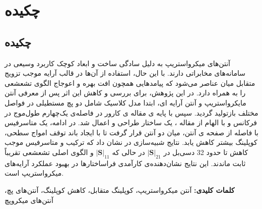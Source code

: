 \chapter*{چکیده}
\thispagestyle{empty}
\section*{چکیده}

آنتن‌های میکرواستریپ به دلیل سادگی ساخت و ابعاد کوچک کاربرد وسیعی در سامانه‌های مخابراتی دارند. با این حال، استفاده از آن‌ها در قالب آرایه موجب تزویج متقابل میان عناصر می‌شود که پیامدهایی همچون افت بهره و اعوجاج الگوی تشعشعی را به همراه دارد. در این پژوهش، برای بررسی و کاهش این اثر پس از معرفی آنتن مایکرواستریپ و آنتن آرایه ای، ابتدا مدل کلاسیک 
\cite{carver1981microstrip}
 شامل دو پچ مستطیلی در فواصل مختلف بازتولید گردید. سپس با پایه ی مقاله ی کارور در فاصله‌ی یک‌چهارم طول‌موج در فرکانس
   و با الهام از مقاله
\cite{hajilou2012mutual}،
     یک ساختار
       طراحی و اعمال شد. در ادامه، یک متاسرفیس با فاصله از صفحه ی آنتن، میان دو آنتن قرار گرفت تا با ایجاد باند توقف امواج سطحی، کوپلینگ بیشتر کاهش یابد. نتایج شبیه‌سازی در 
        نشان داد که ترکیب
          و متاسرفیس موجب کاهش تا حدود 32 دسی‌بل در 
$\vert\bm{S}\vert_{21}$
در حالی که 
$\vert\bm{S}\vert_{11}$
 و الگوی اصلی تشعشعی تقریباً ثابت ماندند. این نتایج نشان‌دهنده‌ی کارآمدی فراساختارها در بهبود عملکرد آرایه‌های میکرواستریپ است.
 
 
\textbf{
کلمات کلیدی:
}
آنتن میکرواستریپ، کوپلینگ متقابل، کاهش کوپلینگ، آنتن‌های پچ، آنتن‌های میکروپچ

